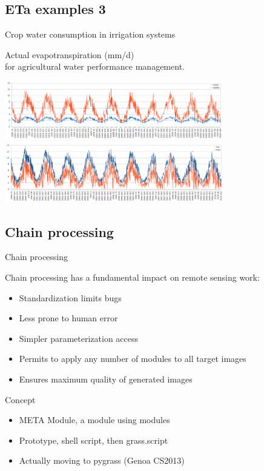 \documentclass[xcolor=dvipsnames,beamer]{beamer} %
\begin{document}
\subsection{ETa examples 3}
\begin{frame}[fragile]{Crop water consumption in irrigation systems}

Actual evapotranspiration (mm/d)\\ 
for agricultural water performance management.\\

\begin{center}
 \includegraphics[width=9.5cm]{ciameanet}\\
 \includegraphics[width=9.5cm]{ciaminmaxet}
\end{center}

\end{frame}

\subsection{Chain processing}
\begin{frame}[fragile]{Chain processing}

Chain processing has a fundamental impact on remote sensing work:\\

\begin{itemize}
 \item Standardization limits bugs
 \item Less prone to human error
 \item Simpler parameterization access
 \item Permits to apply any number of modules to all target images
 \item Ensures maximum quality of generated images
\end{itemize}


\begin{block}{Concept}
\begin{itemize}
 \item META Module, a module using modules
 \item Prototype, shell script, then grass.script
 \item Actually moving to pygrass (Genoa CS2013)
\end{itemize}
\end{block}

\end{frame}
\end{document}

